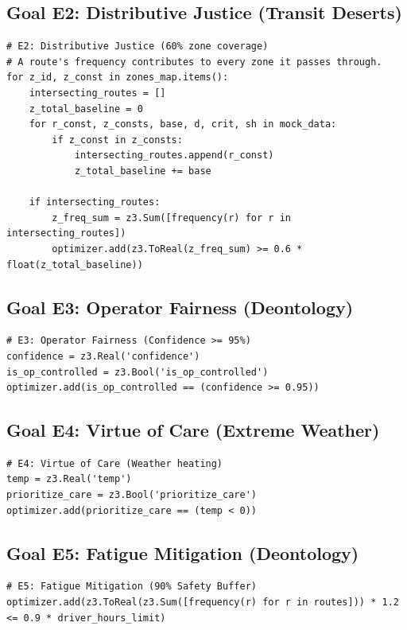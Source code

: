 \documentclass[]
{UCD_CS_41820_Report}
\begin{document}
\subsection{Goal E2: Distributive Justice (Transit Deserts)}
\begin{lstlisting}[style=py]
# E2: Distributive Justice (60% zone coverage)
# A route's frequency contributes to every zone it passes through.
for z_id, z_const in zones_map.items():
    intersecting_routes = []
    z_total_baseline = 0
    for r_const, z_consts, base, d, crit, sh in mock_data:
        if z_const in z_consts:
            intersecting_routes.append(r_const)
            z_total_baseline += base
    
    if intersecting_routes:
        z_freq_sum = z3.Sum([frequency(r) for r in intersecting_routes])
        optimizer.add(z3.ToReal(z_freq_sum) >= 0.6 * float(z_total_baseline))
\end{lstlisting}

\subsection{Goal E3: Operator Fairness (Deontology)}
\begin{lstlisting}[style=py]
# E3: Operator Fairness (Confidence >= 95%)
confidence = z3.Real('confidence')
is_op_controlled = z3.Bool('is_op_controlled')
optimizer.add(is_op_controlled == (confidence >= 0.95))
\end{lstlisting}

\subsection{Goal E4: Virtue of Care (Extreme Weather)}
\begin{lstlisting}[style=py]
# E4: Virtue of Care (Weather heating)
temp = z3.Real('temp')
prioritize_care = z3.Bool('prioritize_care')
optimizer.add(prioritize_care == (temp < 0))
\end{lstlisting}

\subsection{Goal E5: Fatigue Mitigation (Deontology)}
\begin{lstlisting}[style=py]
# E5: Fatigue Mitigation (90% Safety Buffer)
optimizer.add(z3.ToReal(z3.Sum([frequency(r) for r in routes])) * 1.2 <= 0.9 * driver_hours_limit)
\end{lstlisting}
\end{document}
